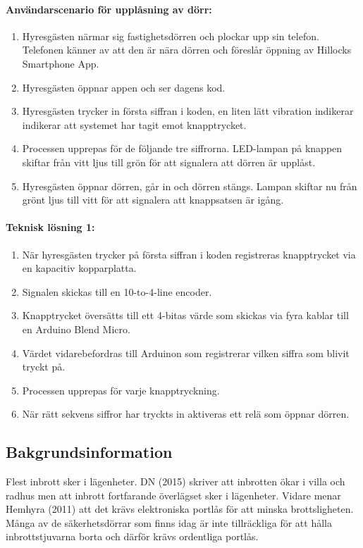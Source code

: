 \documentclass{article}
\begin{document}
\begin{multicols*}{2}
\paragraph{Användarscenario för upplåsning av dörr:} 
\begin{enumerate}
    \item Hyresgästen närmar sig fastighetsdörren och plockar upp sin telefon. Telefonen känner av att den är nära dörren och föreslår öppning av Hillocks Smartphone App.
    \item Hyresgästen öppnar appen och ser dagens kod.
    \item Hyresgästen trycker in första siffran i koden, en liten lätt vibration indikerar indikerar att systemet har tagit emot knapptrycket.
    \item Processen upprepas för de följande tre siffrorna. LED-lampan på knappen skiftar från vitt ljus till grön för att signalera att dörren är upplåst. 
    \item Hyresgästen öppnar dörren, går in och dörren stängs. Lampan skiftar nu från grönt ljus till vitt för att signalera att knappsatsen är igång.
\end{enumerate}
\paragraph{Teknisk lösning 1:} 
\begin{enumerate}
    \item När hyresgästen trycker på första siffran i koden registreras knapptrycket via en kapacitiv kopparplatta.
    \item Signalen skickas till en 10-to-4-line encoder.
    \item Knapptrycket översätts till ett 4-bitas värde som skickas via fyra kablar till en Arduino Blend Micro.
    \item Värdet vidarebefordras till Arduinon som registrerar vilken siffra som blivit tryckt på.
    \item Processen upprepas för varje knapptryckning.
    \item När rätt sekvens siffror har tryckts in aktiveras ett relä som öppnar dörren.

\end{enumerate} 

\subsection{Bakgrundsinformation}
 
Flest inbrott sker i lägenheter. DN (2015)\cite{dn_inbrott} skriver att inbrotten ökar i villa och radhus men att inbrott fortfarande överlägset sker i lägenheter. Vidare menar Hemhyra (2011)\cite{hemhyra_inbrott} att det krävs elektroniska portlås för att minska brottsligheten. Många av de säkerhetsdörrar som finns idag är inte tillräckliga för att hålla inbrottstjuvarna borta och därför krävs ordentliga portlås.


\end{multicols*}
\end{document}
